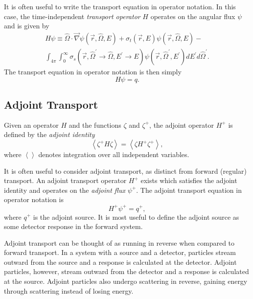 It is often useful to write the transport equation in operator notation.
In this case, the time-independent \textit{transport operator} $H$ operates on the angular flux $\psi$ and is given by
\begin{multline}\label{eq:bg:rt:transport-operator}
  H\psi \equiv
  \hat{\Omega}\cdot\vec{\nabla}\psi\left(\vec{r},\hat{\Omega},E\right) +
  \sigma_t\left(\vec{r},E\right)\psi\left(\vec{r},\hat{\Omega},E\right) - \\
  \int_{4\pi}\int_0^\infty\sigma_s\left(\vec{r},\hat{\Omega}^\prime\rightarrow\hat{\Omega},E^\prime\rightarrow E\right)\psi\left(\vec{r},\hat{\Omega}^\prime,E^\prime\right)dE^\prime d\hat{\Omega}^\prime.
\end{multline}
The transport equation in operator notation is then simply
\begin{equation}\label{eq:bg:rt:transport-opnot}
  H\psi = q.
\end{equation}

\subsection{Adjoint Transport}
\label{sec:bg:rt:at}

Given an operator $H$ and the functions $\zeta$ and $\zeta^+$, the adjoint operator $H^+$ is defined by the \textit{adjoint identity}
\begin{equation}\label{eq:bg:rt:adjoint-identity}
  \left<\zeta^+H\zeta\right> =
  \left<\zeta H^+\zeta^+\right>,
\end{equation}
where $\left<\right>$ denotes integration over all independent variables.

It is often useful to consider adjoint transport, as distinct from forward (regular) transport.
An adjoint transport operator $H^+$ exists which satisfies the adjoint identity and operates on the \textit{adjoint flux} $\psi^+$.
The adjoint transport equation in operator notation is
\begin{equation}\label{eq:bg:rt:adjtransport-opnot}
  H^+\psi^+ = q^+,
\end{equation}
where $q^+$ is the adjoint source.
It is most useful to define the adjoint source as some detector response in the forward system.

Adjoint transport can be thought of as running in reverse when compared to forward transport.
In a system with a source and a detector, particles stream outward from the source and a response is calculated at the detector.
Adjoint particles, however, stream outward from the detector and a response is calculated at the source.
Adjoint particles also undergo scattering in reverse, gaining energy through scattering instead of losing energy.

